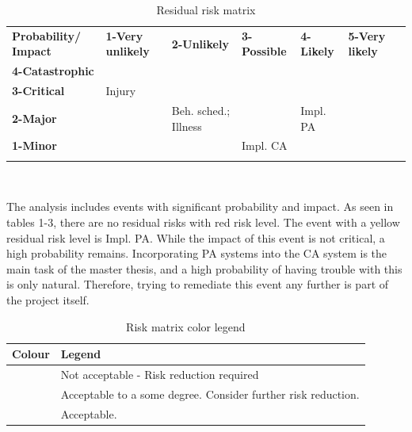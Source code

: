\documentclass[informationsecurity]{gucmasterproject}
\begin{document}
\begin{table}[H]
\centering
\scriptsize
\caption{Residual risk matrix}
\label{tab:residual-risk}
\begin{tabular}{|m{1.75cm}|m{1.75cm}|m{1.75cm}| m{1.75cm} |m{1.75cm}| m{1.75cm}|m{0cm}}
\hhline{|------|} \bf Probability/ Impact & \bf 1-Very unlikely & \bf 2-Unlikely & \bf 3-Possible & \bf 4-Likely & \bf 5-Very likely & \\[10pt]

\hhline{|------|} \bf 4-Catastrophic & \cellcolor{yellow!50} & \cellcolor{red!50} & \cellcolor{red!50} & \cellcolor{red!50} &\cellcolor{red!50} & \\ [10pt]

\hhline{|------|} \bf 3-Critical &\cellcolor{green!50} \centering Injury & \cellcolor{yellow!50} & \cellcolor{yellow!50} & \cellcolor{red!50} &\cellcolor{red!50} & \\ [10pt]

\hhline{|------|} \bf 2-Major & \cellcolor{green!50} & \cellcolor{green!50} \centering Beh. sched.; Illness & \cellcolor{yellow!50} &\cellcolor{yellow!50} \centering Impl. PA &\cellcolor{red!50} & \\[10pt]

\hhline{|------|} \bf 1-Minor & \cellcolor{green!50} & \cellcolor{green!50} & \cellcolor{green!50} \centering Impl. CA &\cellcolor{yellow!50} &\cellcolor{yellow!50} & \\ [10pt]
\hhline{|------|}
\end{tabular} \\
\end{table}

The analysis includes events with significant probability and impact.
As seen in tables 1-3, there are no residual risks with red risk level.
The event with a yellow residual risk level is Impl. PA.
While the impact of this event is not critical, a high probability remains.
Incorporating PA systems into the CA system is the main task of the master thesis, and a high probability of having trouble with this is only natural.
Therefore, trying to remediate this event any further is part of the project itself.

\begin{table}[H]
\centering
\caption{Risk matrix color legend}
\label{tab:colour-legend}
\begin{tabular}{|p{2cm}|p{10cm}|}
\hline \bf Colour & \bf Legend \\
\hline \cellcolor{red! 50} & Not acceptable - Risk reduction required \\ [10pt]
\hline \cellcolor{yellow! 50} & Acceptable to a some degree. Consider further risk reduction. \\[10pt]
\hline \cellcolor{green! 50} & Acceptable. \\ [10pt]
\hline
\end{tabular}
\end{table}
\end{document}

